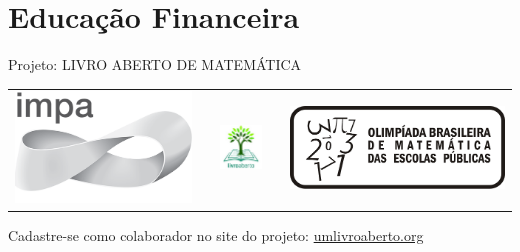 \chapter{Educação Financeira}
\label{fin-chap}

\mbox{}\thispagestyle{empty}\clearpage

\thispagestyle{empty}

\begin{center}
Projeto: LIVRO ABERTO DE MATEMÁTICA

\noindent \begin{tabular}{lcccr}
\includegraphics[scale=.15]{impa}& \quad\quad& \includegraphics[width=3cm]{logo} & \quad\quad& \includegraphics[scale=.24]{obmep} 
\end{tabular}
\end{center}

\vspace*{.3cm}

Cadastre-se como colaborador no site do projeto: \url{umlivroaberto.org}




